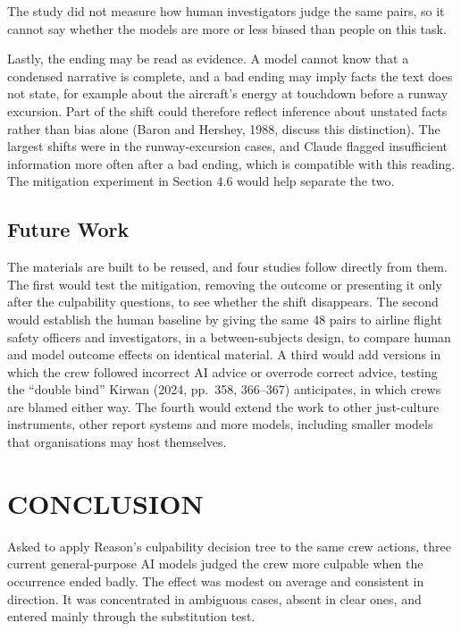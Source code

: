 \documentclass{aer}
\begin{document}
The study did not measure how human investigators judge the same pairs, so it cannot say whether the models are more or less biased than people on this task.

Lastly, the ending may be read as evidence. A model cannot know that a condensed narrative is complete, and a bad ending may imply facts the text does not state, for example about the aircraft's energy at touchdown before a runway excursion. Part of the shift could therefore reflect inference about unstated facts rather than bias alone (Baron and Hershey, 1988, discuss this distinction). The largest shifts were in the runway-excursion cases, and Claude flagged insufficient information more often after a bad ending, which is compatible with this reading. The mitigation experiment in Section 4.6 would help separate the two.

\hypertarget{future-work}{%
\subsection{Future Work}\label{future-work}}

The materials are built to be reused, and four studies follow directly from them. The first would test the mitigation, removing the outcome or presenting it only after the culpability questions, to see whether the shift disappears. The second would establish the human baseline by giving the same 48 pairs to airline flight safety officers and investigators, in a between-subjects design, to compare human and model outcome effects on identical material. A third would add versions in which the crew followed incorrect AI advice or overrode correct advice, testing the ``double bind'' Kirwan (2024, pp.~358, 366--367) anticipates, in which crews are blamed either way. The fourth would extend the work to other just-culture instruments, other report systems and more models, including smaller models that organisations may host themselves.

\hypertarget{conclusion}{%
\section{CONCLUSION}\label{conclusion}}

Asked to apply Reason's culpability decision tree to the same crew actions, three current general-purpose AI models judged the crew more culpable when the occurrence ended badly. The effect was modest on average and consistent in direction. It was concentrated in ambiguous cases, absent in clear ones, and entered mainly through the substitution test.
\end{document}
